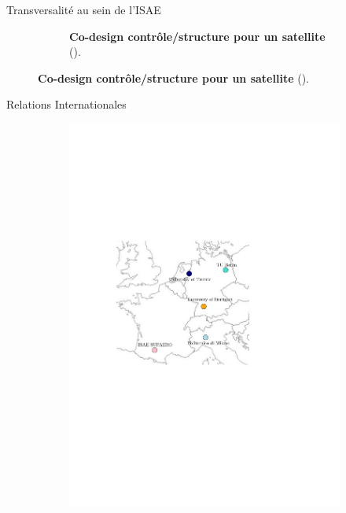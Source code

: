 \documentclass[aspectratio=169, french]{beamer}
\begin{document}
\begin{frame}{Transversalité au sein de l'ISAE}
\begin{figure}[t]
\begin{subfigure}{0.5\textwidth}
		\caption*{\textbf{Co-design contrôle/structure pour un satellite} (\cite{finozzi2022sub}).}
	\end{subfigure}
\end{figure}

\end{frame}

\begin{frame}{Relations Internationales}
	\begin{figure}[t]
		\begin{subfigure}{0.5\textwidth}
			\includegraphics[width=.95\textwidth]{mappe_reseau_europe.pdf}%
		\end{subfigure}\hfill
		\begin{subfigure}{0.4\textwidth}

\end{subfigure}
\end{figure}
\end{frame}
\end{document}
